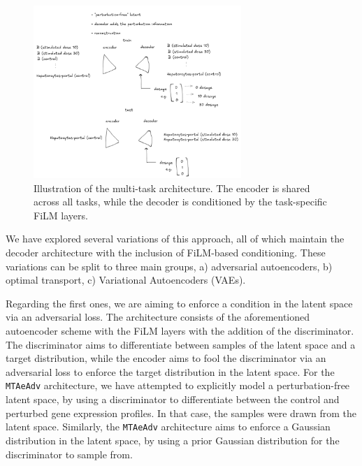 \documentclass[12pt, a4paper]{article}
\begin{document}
\begin{figure}
    \centering
    \includegraphics[width=0.7\textwidth]{ae_sketch.png}
    \caption{Illustration of the multi-task architecture. The encoder is shared across all tasks, while the decoder is conditioned by the task-specific FiLM layers.}
\end{figure}

We have explored several variations of this approach, all of which maintain the decoder architecture with the inclusion of FiLM-based conditioning. These variations can be split to three main groups, a) adversarial autoencoders, b) optimal transport, c) Variational Autoencoders (VAEs).

Regarding the first ones, we are aiming to enforce a condition in the latent space via an adversarial loss. The architecture consists of the aforementioned autoencoder scheme with the FiLM layers with the addition of the discriminator. The discriminator aims to differentiate between samples of the latent space and a target distribution, while the encoder aims to fool the discriminator via an adversarial loss to enforce the target distribution in the latent space. For the  \verb|MTAeAdv| architecture, we have attempted to explicitly model a perturbation-free latent space, by using a discriminator to differentiate between the control and perturbed gene expression profiles. In that case, the samples were drawn from the latent space. Similarly, the \verb|MTAeAdv| architecture aims to enforce a Gaussian distribution in the latent space, by using a prior Gaussian distribution for the discriminator to sample from. 
\end{document}
